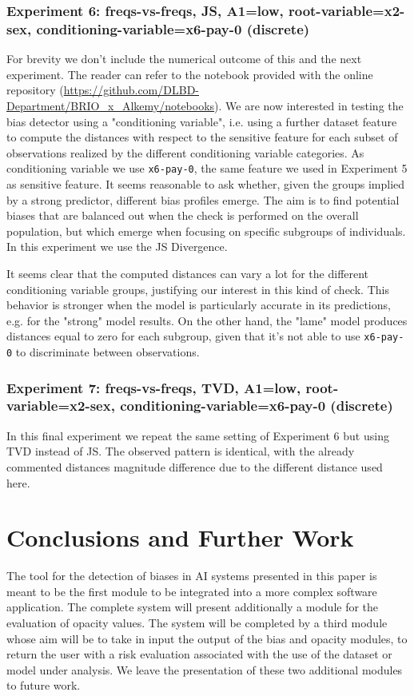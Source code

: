 \documentclass[
]{ceurart}
\begin{document}
\subsubsection{Experiment 6: freqs-vs-freqs, JS, A1=low, root-variable=x2-sex, conditioning-variable=x6-pay-0 (discrete)}
For brevity we don't include the numerical outcome of this and the next experiment. The reader can refer to the notebook provided with the online repository (\url{https://github.com/DLBD-Department/BRIO_x_Alkemy/notebooks}). We are now interested in testing the bias detector using a "conditioning variable", i.e. using a further dataset feature to compute the distances with respect to the sensitive feature for each subset of observations realized by the different conditioning variable categories. As conditioning variable we use \texttt{x6-pay-0}, the same feature we used in Experiment 5 as sensitive feature. It seems reasonable to ask whether, given the groups implied by a strong predictor, different bias profiles emerge. The aim is to find potential biases that are balanced out when the check is performed on the overall population, but which emerge when focusing on specific subgroups of individuals. In this experiment we use the JS Divergence. 

It seems clear that the computed distances can vary a lot for the different conditioning variable groups, justifying our interest in this kind of check. This behavior is stronger when the model is particularly accurate in its predictions, e.g. for the "strong" model results. On the other hand, the "lame" model produces distances equal to zero for each subgroup, given that it's not able to use \texttt{x6-pay-0} to discriminate between observations. 

\subsubsection{Experiment 7: freqs-vs-freqs, TVD, A1=low, root-variable=x2-sex, conditioning-variable=x6-pay-0 (discrete)}
In this final experiment we repeat the same setting of Experiment 6 but using TVD instead of JS. The observed pattern is identical, with the already commented distances magnitude difference due to the different distance used here. 

\section{Conclusions and Further Work}
\label{sec:conclusions}

The tool for the detection of biases in AI systems presented in this paper is meant to be the first module to be integrated into a more complex software application. The complete system will present additionally a module for the evaluation of opacity values. The system will be completed by a third module whose aim will be to take in input the output of the bias and opacity modules, to return the user with a risk evaluation associated with the use of the dataset or model under analysis. We leave the presentation of these two additional modules to future work.
\end{document}
